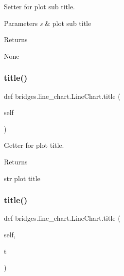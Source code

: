 Setter for plot sub title. 


\begin{DoxyParams}{Parameters}
{\em s} & plot sub title \\
\hline
\end{DoxyParams}
\begin{DoxyReturn}{Returns}


None 
\end{DoxyReturn}
\mbox{\label{classbridges_1_1line__chart_1_1_line_chart_ae9a4a1643095d0d0ac4d98e15adbeb3f}} 
\subsubsection{\texorpdfstring{title()}{title()}\hspace{0.1cm}{\footnotesize\ttfamily [1/2]}}
{\footnotesize\ttfamily def bridges.\+line\+\_\+chart.\+Line\+Chart.\+title (\begin{DoxyParamCaption}\item[{}]{self }\end{DoxyParamCaption})}



Getter for plot title. 

\begin{DoxyReturn}{Returns}


str plot title 
\end{DoxyReturn}
\mbox{\label{classbridges_1_1line__chart_1_1_line_chart_adbee0286b07ee001e0c762aa9c147946}} 
\subsubsection{\texorpdfstring{title()}{title()}\hspace{0.1cm}{\footnotesize\ttfamily [2/2]}}
{\footnotesize\ttfamily def bridges.\+line\+\_\+chart.\+Line\+Chart.\+title (\begin{DoxyParamCaption}\item[{}]{self,  }\item[{}]{t }\end{DoxyParamCaption})}



